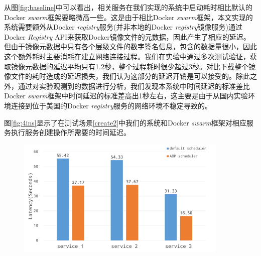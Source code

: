 从图\ref{fig:baseline}中可以看出，相关服务在我们实现的系统中启动耗时相比默认的Docker \emph{swarm}框架要略微高一些。这是由于相比Docker \emph{swarm}框架，本文实现的系统需要额外从Docker \emph{registry}服务(并非本地的Docker \emph{registry}镜像服务)通过Docker \emph{Registry} API来获取Docker镜像文件的元数据，因此产生了相应的延迟。但由于镜像元数据中只有各个层级文件的数字签名信息，包含的数据量很小，因此这个额外耗时主要消耗在建立网络连接过程。我们在实验中通过多次测试验证，获取镜像元数据的延迟平均只有1.2秒，整个过程耗时很少超过3秒。对比下载整个镜像文件的耗时造成的延迟损失，我们认为这部分的延迟开销是可以接受的。除此之外，通过对实验观测到的数据进行分析，我们发现本系统中时间延迟的标准差比Docker \emph{swarm}框架中时间延迟的标准差高出1秒左右，这主要是由于从国内实验环境连接到位于美国的Docker \emph{registry}服务的网络环境不稳定导致的。

图\ref{fig:4ins}显示了在测试场景\ref{create2}中我们的系统和Docker \emph{swarm}框架对相应服务执行服务创建操作所需要的时间延迟。
\begin{figure}[H]
\centering
\includegraphics[width=0.9\textwidth]{./figure/4ins2rep}
\end{figure}

